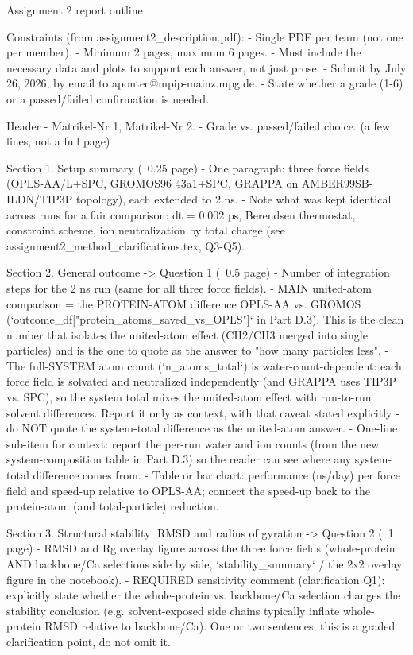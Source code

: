 Assignment 2 report outline

Constraints (from assignment2_description.pdf):
- Single PDF per team (not one per member).
- Minimum 2 pages, maximum 6 pages.
- Must include the necessary data and plots to support each answer, not just prose.
- Submit by July 26, 2026, by email to apontec@mpip-mainz.mpg.de.
- State whether a grade (1-6) or a passed/failed confirmation is needed.

Header
- Matrikel-Nr 1, Matrikel-Nr 2.
- Grade vs. passed/failed choice.
(a few lines, not a full page)

Section 1. Setup summary (~0.25 page)
- One paragraph: three force fields (OPLS-AA/L+SPC, GROMOS96 43a1+SPC, GRAPPA on
  AMBER99SB-ILDN/TIP3P topology), each extended to 2 ns.
- Note what was kept identical across runs for a fair comparison: dt = 0.002 ps, Berendsen
  thermostat, constraint scheme, ion neutralization by total charge (see
  assignment2_method_clarifications.tex, Q3-Q5).

Section 2. General outcome -> Question 1 (~0.5 page)
- Number of integration steps for the 2 ns run (same for all three force fields).
- MAIN united-atom comparison = the PROTEIN-ATOM difference OPLS-AA vs. GROMOS
  (`outcome_df["protein_atoms_saved_vs_OPLS"]` in Part D.3). This is the clean number that
  isolates the united-atom effect (CH2/CH3 merged into single particles) and is the one to
  quote as the answer to "how many particles less".
- The full-SYSTEM atom count (`n_atoms_total`) is water-count-dependent: each force field is
  solvated and neutralized independently (and GRAPPA uses TIP3P vs. SPC), so the system total
  mixes the united-atom effect with run-to-run solvent differences. Report it only as context,
  with that caveat stated explicitly - do NOT quote the system-total difference as the
  united-atom answer.
- One-line sub-item for context: report the per-run water and ion counts (from the new
  system-composition table in Part D.3) so the reader can see where any system-total difference
  comes from.
- Table or bar chart: performance (ns/day) per force field and speed-up relative to OPLS-AA;
  connect the speed-up back to the protein-atom (and total-particle) reduction.

Section 3. Structural stability: RMSD and radius of gyration -> Question 2 (~1 page)
- RMSD and Rg overlay figure across the three force fields (whole-protein AND backbone/Ca
  selections side by side, `stability_summary` / the 2x2 overlay figure in the notebook).
- REQUIRED sensitivity comment (clarification Q1): explicitly state whether the whole-protein
  vs. backbone/Ca selection changes the stability conclusion (e.g. solvent-exposed side chains
  typically inflate whole-protein RMSD relative to backbone/Ca). One or two sentences; this is
  a graded clarification point, do not omit it.

